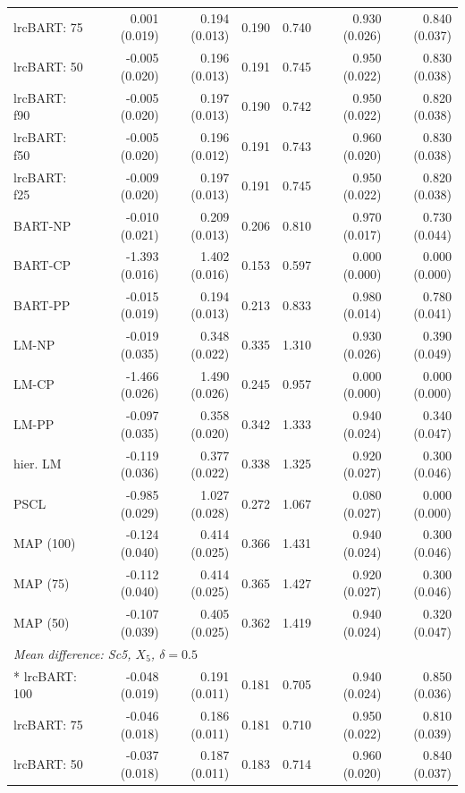 \begin{landscape}
\begin{longtable}{lrrrrrr}
lrcBART: 75 & 0.001 (0.019) & 0.194 (0.013) & 0.190 & 0.740 & 0.930 (0.026) & 0.840 (0.037) \\
lrcBART: 50 & -0.005 (0.020) & 0.196 (0.013) & 0.191 & 0.745 & 0.950 (0.022) & 0.830 (0.038) \\
lrcBART: f90 & -0.005 (0.020) & 0.197 (0.013) & 0.190 & 0.742 & 0.950 (0.022) & 0.820 (0.038) \\
lrcBART: f50 & -0.005 (0.020) & 0.196 (0.012) & 0.191 & 0.743 & 0.960 (0.020) & 0.830 (0.038) \\
lrcBART: f25 & -0.009 (0.020) & 0.197 (0.013) & 0.191 & 0.745 & 0.950 (0.022) & 0.820 (0.038) \\
BART-NP & -0.010 (0.021) & 0.209 (0.013) & 0.206 & 0.810 & 0.970 (0.017) & 0.730 (0.044) \\
BART-CP & -1.393 (0.016) & 1.402 (0.016) & 0.153 & 0.597 & 0.000 (0.000) & 0.000 (0.000) \\
BART-PP & -0.015 (0.019) & 0.194 (0.013) & 0.213 & 0.833 & 0.980 (0.014) & 0.780 (0.041) \\
LM-NP & -0.019 (0.035) & 0.348 (0.022) & 0.335 & 1.310 & 0.930 (0.026) & 0.390 (0.049) \\
LM-CP & -1.466 (0.026) & 1.490 (0.026) & 0.245 & 0.957 & 0.000 (0.000) & 0.000 (0.000) \\
LM-PP & -0.097 (0.035) & 0.358 (0.020) & 0.342 & 1.333 & 0.940 (0.024) & 0.340 (0.047) \\
hier. LM & -0.119 (0.036) & 0.377 (0.022) & 0.338 & 1.325 & 0.920 (0.027) & 0.300 (0.046) \\
PSCL & -0.985 (0.029) & 1.027 (0.028) & 0.272 & 1.067 & 0.080 (0.027) & 0.000 (0.000) \\
MAP (100) & -0.124 (0.040) & 0.414 (0.025) & 0.366 & 1.431 & 0.940 (0.024) & 0.300 (0.046) \\
MAP (75) & -0.112 (0.040) & 0.414 (0.025) & 0.365 & 1.427 & 0.920 (0.027) & 0.300 (0.046) \\
MAP (50) & -0.107 (0.039) & 0.405 (0.025) & 0.362 & 1.419 & 0.940 (0.024) & 0.320 (0.047) \\
\multicolumn{7}{l}{\strut\textit{Mean difference: Sc5, $X_5$, $\delta=0.5$}}\\*
lrcBART: 100 & -0.048 (0.019) & 0.191 (0.011) & 0.181 & 0.705 & 0.940 (0.024) & 0.850 (0.036) \\
lrcBART: 75 & -0.046 (0.018) & 0.186 (0.011) & 0.181 & 0.710 & 0.950 (0.022) & 0.810 (0.039) \\
lrcBART: 50 & -0.037 (0.018) & 0.187 (0.011) & 0.183 & 0.714 & 0.960 (0.020) & 0.840 (0.037) \\

\end{longtable}
\end{landscape}
